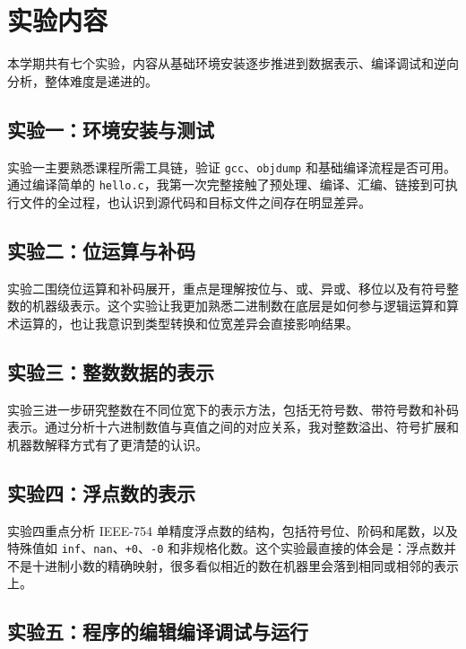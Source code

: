 \documentclass[12pt, a4paper]{academics}
\begin{document}
\makeacademicscover

\section{实验内容}

本学期共有七个实验，内容从基础环境安装逐步推进到数据表示、编译调试和逆向分析，整体难度是递进的。

\subsection{实验一：环境安装与测试}

实验一主要熟悉课程所需工具链，验证 \texttt{gcc}、\texttt{objdump} 和基础编译流程是否可用。通过编译简单的 \texttt{hello.c}，我第一次完整接触了预处理、编译、汇编、链接到可执行文件的全过程，也认识到源代码和目标文件之间存在明显差异。

\subsection{实验二：位运算与补码}

实验二围绕位运算和补码展开，重点是理解按位与、或、异或、移位以及有符号整数的机器级表示。这个实验让我更加熟悉二进制数在底层是如何参与逻辑运算和算术运算的，也让我意识到类型转换和位宽差异会直接影响结果。

\subsection{实验三：整数数据的表示}

实验三进一步研究整数在不同位宽下的表示方法，包括无符号数、带符号数和补码表示。通过分析十六进制数值与真值之间的对应关系，我对整数溢出、符号扩展和机器数解释方式有了更清楚的认识。

\subsection{实验四：浮点数的表示}

实验四重点分析 IEEE-754 单精度浮点数的结构，包括符号位、阶码和尾数，以及特殊值如 \texttt{inf}、\texttt{nan}、\texttt{+0}、\texttt{-0} 和非规格化数。这个实验最直接的体会是：浮点数并不是十进制小数的精确映射，很多看似相近的数在机器里会落到相同或相邻的表示上。

\subsection{实验五：程序的编辑编译调试与运行}
\end{document}
